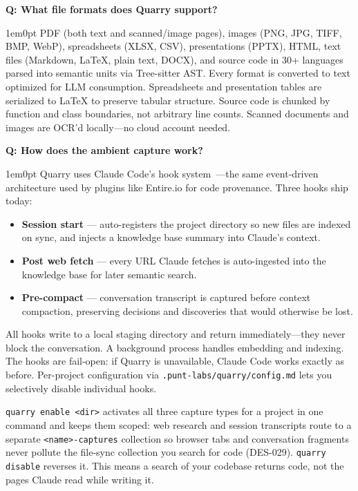 \documentclass[11pt,letterpaper]{article}
\newcounter{faqnum}
\newenvironment{faqpair}[1]{%
  \needspace{4\baselineskip}%
  \vspace{0.5em}%
  \refstepcounter{faqnum}%
  \noindent\textbf{\color{SectionBlue}Q\thefaqnum: #1}\par\nopagebreak[4]%
  \vspace{0.2em}%
  \begin{adjustwidth}{1em}{0pt}%
  \setlength{\parindent}{0pt}%
}{%
  \end{adjustwidth}%
  \vspace{0.5em}%
}
\begin{document}
\begin{faqpair}{What file formats does Quarry support?}\label{faq:formats}
  PDF (both text and scanned/image pages), images (PNG, JPG, TIFF, BMP, WebP),
  spreadsheets (XLSX, CSV), presentations (PPTX), HTML, text files (Markdown,
  LaTeX, plain text, DOCX), and source code in 30+ languages parsed into
  semantic units via Tree-sitter AST. Every format is converted to text
  optimized for LLM consumption. Spreadsheets and presentation tables are
  serialized to LaTeX to preserve tabular structure. Source code is chunked by
  function and class boundaries, not arbitrary line counts. Scanned documents
  and images are OCR'd locally---no cloud account needed.
\end{faqpair}

\begin{faqpair}{How does the ambient capture work?}\label{faq:how-it-works}
  Quarry uses Claude Code's hook system~\cite{claude-code-hooks}---the same
  event-driven architecture used by plugins like Entire.io for code provenance.
  Three hooks ship today:

  \begin{itemize}[leftmargin=1.5em, nosep]
    \item \textbf{Session start} --- auto-registers the project directory so
          new files are indexed on sync, and injects a knowledge base summary
          into Claude's context.
    \item \textbf{Post web fetch} --- every URL Claude fetches is auto-ingested
          into the knowledge base for later semantic search.
    \item \textbf{Pre-compact} --- conversation transcript is captured before
          context compaction, preserving decisions and discoveries that would
          otherwise be lost.
  \end{itemize}

  All hooks write to a local staging directory and return
  immediately---they never block the conversation. A background process handles
  embedding and indexing. The hooks are fail-open: if Quarry is unavailable,
  Claude Code works exactly as before. Per-project configuration via
  \texttt{.punt-labs/quarry/config.md} lets you selectively disable individual
  hooks.

  \texttt{quarry enable <dir>} activates all three capture types for a project
  in one command and keeps them scoped: web research and session transcripts
  route to a separate \texttt{<name>-captures} collection so browser tabs and
  conversation fragments never pollute the file-sync collection you search for
  code (DES-029). \texttt{quarry disable} reverses it. This means a search of
  your codebase returns code, not the pages Claude read while writing it.
\end{faqpair}
\end{document}
